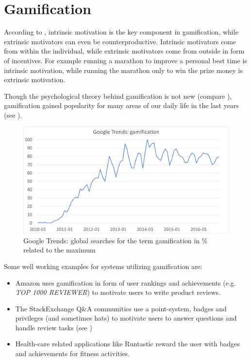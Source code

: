 \section{Gamification} \label{Gamification}

According to \textcite{Herger2015}, intrinsic motivation is the key component in gamification, while extrinsic motivators can even be counterproductive. Intrinsic motivators come from within the individual, while extrinsic motivators come from outside in form of incentives. For example running a marathon to improve a personal best time is intrinsic motivation, while running the marathon only to win the prize money is extrinsic motivation.

Though the psychological theory behind gamification is not new (compare \autocite{White1959}), gamification gained popularity for many areas of our daily life in the last years (see ).

\begin{figure}[tbp] %
	\caption[Google Trends: gamification]{Google Trends: global searches for the term gamification in \% related to the maximum} \label{figure:Google trends gamification}
	\includegraphics[scale=1.0]{figures/google_trends_gamification.png}
\end{figure}

Some well working examples for systems utilizing gamification are:
\begin{itemize}
	\item Amazon uses gamification in form of user rankings and achievements (e.g. \textit{TOP 1000 REVIEWER}) to motivate users to write product reviews.
	\item The StackExchange Q\&A communities use a point-system, badges and privileges (and sometimes hats) to motivate users to answer questions and handle review tasks (see )
	\item Health-care related applications like Runtastic reward the user with badges and achievements for fitness activities.
\end{itemize}

